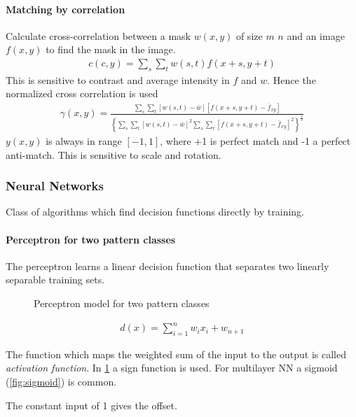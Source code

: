 \paragraph{Matching by correlation}
Calculate cross-correlation between a mask $w(x,y)$ of size $m$ $n$ and an image
$f(x,y)$ to find the mask in the image.
\begin{align*}
	c(c,y) = \sum_s\sum_tw(s,t)f(x+s,y+t)
\end{align*}
This is sensitive to contrast and average intensity in $f$ and $w$.
Hence the normalized cross correlation is used
\begin{align*}
	\gamma(x,y) = \frac{\sum_s\sum_t\left[w(s,t)-\bar{w}\right]\left[f(x+s,y+t)-\bar f_{xy}\right]}
	{
	\left\lbrace
		\sum_s\sum_t\left[w(s,t)-\bar w\right]^2
		\sum_s\sum_t\left[f(x+s,y+t)-\bar f_{xy}\right]^2
	\right\rbrace^{\frac{1}{2}}
	}
\end{align*}
$y(x,y)$ is always in range $[-1, 1]$, where +1 is perfect match and -1 a perfect anti-match.
This is sensitive to scale and rotation.

\subsubsection{Neural Networks}

Class of algorithms which find decision functions directly by training.

\paragraph{Perceptron for two pattern classes}

The perceptron learns a linear decision function that separates two linearly separable training sets.

\begin{figure}[htb]
\centering

\caption{Perceptron model for two pattern classes}
\label{fig:perceptron}
\end{figure}
\begin{align*}
d(x) = \sum_{i=1}^nw_ix_i + w_{n+1}
\end{align*}

The function which maps the weighted sum of the input to the output is called \emph{activation function}.
In \ref{fig:perceptron} a sign function is used.
For multilayer NN a sigmoid (\ref{fig:sigmoid}) is common.

The constant input of 1 gives the offset.


